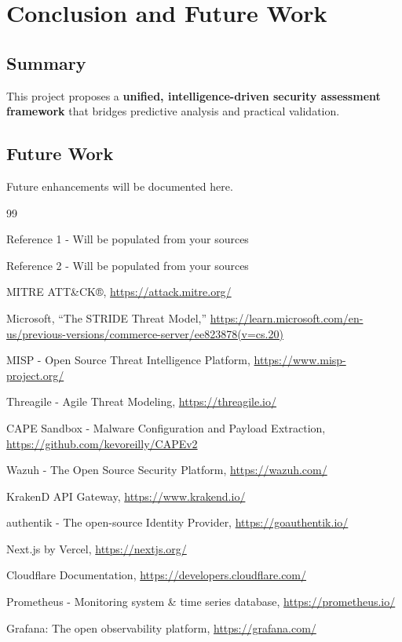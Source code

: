 \documentclass[12pt,a4paper]{report}
\begin{document}
\chapter{Conclusion and Future Work}
\label{ch:conclusion}

\section{Summary}

This project proposes a \textbf{unified, intelligence-driven security assessment framework} that bridges predictive analysis and practical validation.

\section{Future Work}

Future enhancements will be documented here.

\begin{thebibliography}{99}

Reference 1 - Will be populated from your sources

Reference 2 - Will be populated from your sources

MITRE ATT\&CK®, \url{https://attack.mitre.org/}

Microsoft, ``The STRIDE Threat Model,'' \url{https://learn.microsoft.com/en-us/previous-versions/commerce-server/ee823878(v=cs.20)}

MISP - Open Source Threat Intelligence Platform, \url{https://www.misp-project.org/}

Threagile - Agile Threat Modeling, \url{https://threagile.io/}

CAPE Sandbox - Malware Configuration and Payload Extraction, \url{https://github.com/kevoreilly/CAPEv2}

Wazuh - The Open Source Security Platform, \url{https://wazuh.com/}

KrakenD API Gateway, \url{https://www.krakend.io/}

authentik - The open-source Identity Provider, \url{https://goauthentik.io/}

Next.js by Vercel, \url{https://nextjs.org/}

Cloudflare Documentation, \url{https://developers.cloudflare.com/}

Prometheus - Monitoring system \& time series database, \url{https://prometheus.io/}

Grafana: The open observability platform, \url{https://grafana.com/}

\end{thebibliography}
\end{document}
